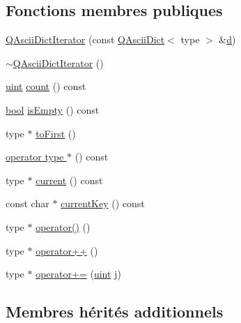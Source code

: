 \subsection*{Fonctions membres publiques}
\begin{DoxyCompactItemize}
\item 
\hyperlink{class_q_ascii_dict_iterator_a3827c689eb4610420c9d4a47ae9f41af}{Q\+Ascii\+Dict\+Iterator} (const \hyperlink{class_q_ascii_dict}{Q\+Ascii\+Dict}$<$ type $>$ \&\hyperlink{060__command__switch_8tcl_af43f4b1f0064a33b2d662af9f06d3a00}{d})
\item 
\hyperlink{class_q_ascii_dict_iterator_aefa88b2daac27b6474706d83e83bb745}{$\sim$\+Q\+Ascii\+Dict\+Iterator} ()
\item 
\hyperlink{qglobal_8h_a4d3943ddea65db7163a58e6c7e8df95a}{uint} \hyperlink{class_q_ascii_dict_iterator_a24ea89a148ab20e0fb609e53a2a8dc99}{count} () const 
\item 
\hyperlink{qglobal_8h_a1062901a7428fdd9c7f180f5e01ea056}{bool} \hyperlink{class_q_ascii_dict_iterator_a17666020314df1ea0bf342fc33a935cd}{is\+Empty} () const 
\item 
type $\ast$ \hyperlink{class_q_ascii_dict_iterator_af99d7e6fff55ecd58ef68633e6b17a22}{to\+First} ()
\item 
\hyperlink{class_q_ascii_dict_iterator_a317fc336e2629bbecc3afdd037e9f424}{operator type $\ast$} () const 
\item 
type $\ast$ \hyperlink{class_q_ascii_dict_iterator_ab0f18446d420b4ee0dd96832dda0c1bb}{current} () const 
\item 
const char $\ast$ \hyperlink{class_q_ascii_dict_iterator_a606d7df22b11bf439fb8938af59b0a0e}{current\+Key} () const 
\item 
type $\ast$ \hyperlink{class_q_ascii_dict_iterator_a84bfab2fda0e401040f5f30c2d3350c8}{operator()} ()
\item 
type $\ast$ \hyperlink{class_q_ascii_dict_iterator_a9e26f1d9b78f7fc1faa85b504fe74db0}{operator++} ()
\item 
type $\ast$ \hyperlink{class_q_ascii_dict_iterator_acd73a2e7762744842753fe0c8a63d67d}{operator+=} (\hyperlink{qglobal_8h_a4d3943ddea65db7163a58e6c7e8df95a}{uint} \hyperlink{060__command__switch_8tcl_a2aaa92757686acea102cba3475f0c13b}{j})
\end{DoxyCompactItemize}
\subsection*{Membres hérités additionnels}


